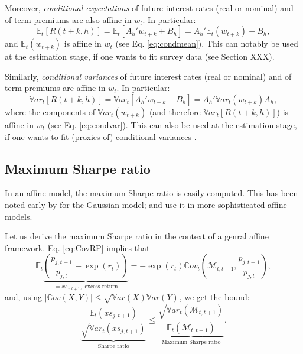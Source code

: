\documentclass[
  12pt,
]{book}
\theoremstyle{definition}
\theoremstyle{definition}
\theoremstyle{definition}
\theoremstyle{definition}
\theoremstyle{remark}
\begin{document}
Moreover, \emph{conditional expectations} of future interest rates (real or nominal) and of term premiums are also affine in \(w_t\). In particular:
\begin{equation}
\mathbb{E}_t[R(t+k,h)] = \mathbb{E}_t[{A_h}'w_{t+k} + B_h] = {A_h}'\mathbb{E}_t(w_{t+k}) + B_h,\label{eq:condmeanRth}
\end{equation}
and \(\mathbb{E}_t(w_{t+k})\) is affine in \(w_t\) (see Eq. \eqref{eq:condmean}). This can notably be used at the estimation stage, if one wants to fit survey data (see Section XXX).

Similarly, \emph{conditional variances} of future interest rates (real or nominal) and of term premiums are affine in \(w_t\). In particular:
\begin{equation}
\mathbb{V}ar_t[R(t+k,h)] = \mathbb{V}ar_t[{A_h}'w_{t+k} + B_h] = {A_h}'\mathbb{V}ar_t(w_{t+k})A_h,\label{eq:condvarRth}
\end{equation}
where the components of \(\mathbb{V}ar_t(w_{t+k})\) (and therefore \(\mathbb{V}ar_t[R(t+k,h)]\)) is affine in \(w_t\) (see Eq. \eqref{eq:condvar}). This can also be used at the estimation stage, if one wants to fit (proxies of) conditional variances \citep{zarg_2017}.

\hypertarget{maximum-sharpe-ratio}{%
\subsection{Maximum Sharpe ratio}\label{maximum-sharpe-ratio}}

In an affine model, the maximum Sharpe ratio is easily computed. This has been noted early by \citet{Duffee_2010} for the Gaussian model; \citet{Gourieroux_Monfort_Mouabbi_Renne_2021} and \citet{Pallara_Renne_2023} use it in more sophisticated affine models.

Let us derive the maximum Sharpe ratio in the context of a genral affine framework. Eq. \eqref{eq:CovRP} implies that
\[
\mathbb{E}_t\underbrace{\left(\frac{p_{j,t+1}}{p_{j,t}} - \exp(r_t)\right)}_{=xs_{j,t+1},\mbox{ excess return}} =  - \exp(r_t) \mathbb{C}ov_t\left(\mathcal{M}_{t,t+1},\frac{p_{j,t+1}}{p_{j,t}}\right),
\]
and, using \(|\mathbb{C}ov(X,Y)| \le \sqrt{\mathbb{V}ar(X)\mathbb{V}ar(Y)}\), we get the \citet{Hansen_Jagannathan_1991} bound:
\begin{equation}
\underbrace{\frac{\mathbb{E}_t(xs_{j,t+1})}{\sqrt{\mathbb{V}ar_t(xs_{j,t+1})}}}_{\mbox{Sharpe ratio}} \le \underbrace{\frac{\sqrt{\mathbb{V}ar_t(\mathcal{M}_{t,t+1})}}{\mathbb{E}_t(\mathcal{M}_{t,t+1})}}_{\mbox{Maximum Sharpe ratio}}.
\end{equation}
\end{document}
